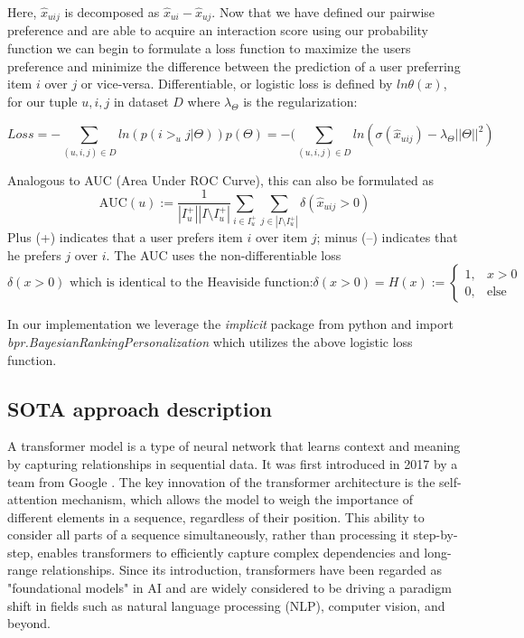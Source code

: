 \documentclass{article}
\begin{document}
Here, $\hat x_{uij}$ is decomposed as $\hat x_{ui} - \hat x_{uj}$. Now that we have defined our pairwise preference and are able to acquire an interaction score using our probability function we can begin to formulate a loss function to maximize the users preference and minimize the difference between the prediction of a user preferring item \(i\) over \(j\) or vice-versa. Differentiable, or logistic loss \cite{bpr-arix} is defined by \(ln \theta(x)\), for our tuple \(u, i, j\) in dataset \(D\) where $\lambda_{\Theta}$ is the regularization:
\begin{center}
    \[
    Loss = - \sum_{(u, i, j) \in D} ln(p(i>_{u} j|\Theta)) p(\Theta) 
    = - (\sum_{(u, i, j) \in D} ln (\sigma(\hat x_{uij}) - \lambda_{\Theta} ||\Theta||^2)
    \]
\end{center}


Analogous to AUC (Area Under ROC Curve), this can also be formulated as 
\[\text{AUC}(u) := \frac{1}{|I_u^+| |I \setminus I_u^+|} \sum_{i \in I_u^+} \sum_{j \in |I \setminus I_u^+|} \delta(\hat{x}_{uij} > 0)\]
Plus (+) indicates that a user prefers item $i$ over item $j$; minus (–) indicates that he prefers $j$ over $i$. The AUC uses the non-differentiable loss
\[
\delta(x > 0) \text{ which is identical to the Heaviside function:}
\delta(x > 0) = H(x) := \begin{cases}
1, & x > 0 \\
0, & \text{else}
\end{cases}
\]

In our implementation we leverage the \textit{implicit} package from python and import \textit{bpr.BayesianRankingPersonalization} which utilizes the above logistic loss function. 

\subsection{SOTA approach description}

A transformer model is a type of neural network that learns context and meaning by capturing relationships in sequential data. It was first introduced in 2017 by a team from Google \cite{transformer}. The key innovation of the transformer architecture is the self-attention mechanism, which allows the model to weigh the importance of different elements in a sequence, regardless of their position. This ability to consider all parts of a sequence simultaneously, rather than processing it step-by-step, enables transformers to efficiently capture complex dependencies and long-range relationships. Since its introduction, transformers have been regarded as "foundational models" in AI and are widely considered to be driving a paradigm shift in fields such as natural language processing (NLP), computer vision, and beyond.
\end{document}
